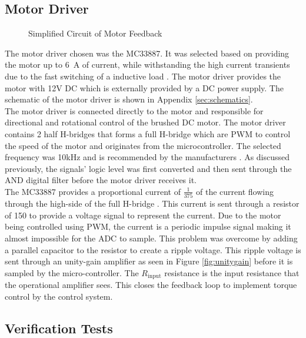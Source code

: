 \subsection{Motor Driver}
\begin{figure}[h]
	\centering
	
	\caption{Simplified Circuit of Motor Feedback}
	\label{fig:feedback_current}
\end{figure}


The motor driver chosen was the MC33887. It was selected based on providing the motor up to \SI{6}{\ampere} of current, while withstanding the high current transients due to the fast switching of a inductive load \citep{motorIC}. The motor driver provides the motor with 12V DC which is externally provided by a DC power supply. The schematic of the motor driver is shown in Appendix \ref{sec:schematics}.\\

The motor driver is connected directly to the motor and responsible for directional and rotational control of the brushed DC motor. The motor driver contains 2 half H-bridges that forms a full H-bridge which are PWM to control the speed of the motor and originates from the microcontroller. The selected frequency was 10kHz and is recommended by the manufacturers \citep{motorIC}. As discussed previously, the signals' logic level was first converted and then sent through the AND digital filter before the motor driver receives it.\\

The MC33887 provides a proportional current of $\frac{1}{375}$ of the current flowing through the high-side of the full H-bridge \citep{motorIC}. This current is sent through a resistor of \SI{150}{\Omega} to provide a voltage signal to represent the current. Due to the motor being controlled using PWM, the current is a periodic impulse signal making it almost impossible for the ADC to sample. This problem was overcome by adding a parallel capacitor to the resistor to create a ripple voltage. This ripple voltage is sent through an unity-gain amplifier as seen in Figure \ref{fig:unitygain} before it is sampled by the micro-controller. The $R_{\text{input}}$ resistance is the input resistance that the operational amplifier sees. This closes the feedback loop to implement torque control by the control system.\\

\subsection{Verification Tests}

